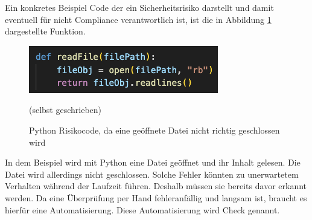 \documentclass[../main.tex]{subfiles}
\begin{document}
Ein konkretes Beispiel Code der ein Sicherheitsrisiko darstellt und damit eventuell für nicht Compliance verantwortlich ist, ist die in Abbildung \ref{fig:codecompliance} dargestellte Funktion.

\begin{figure}[ht]
    \centering
    \includegraphics[scale=1]{bilder/CodeScreenShot.png}
    \caption{Python Risikocode, da eine geöffnete Datei nicht richtig geschlossen wird}
    \footnotesize (selbst geschrieben)
    
    \label{fig:codecompliance}
\end{figure}

In dem Beispiel wird mit Python eine Datei geöffnet und ihr Inhalt gelesen.
Die Datei wird allerdings nicht geschlossen.
Solche Fehler könnten zu unerwartetem Verhalten während der Laufzeit führen.
Deshalb müssen sie bereits davor erkannt werden.
Da eine Überprüfung per Hand fehleranfällig und langsam ist, braucht es hierfür eine Automatisierung.
Diese Automatisierung wird Check genannt.
\end{document}
